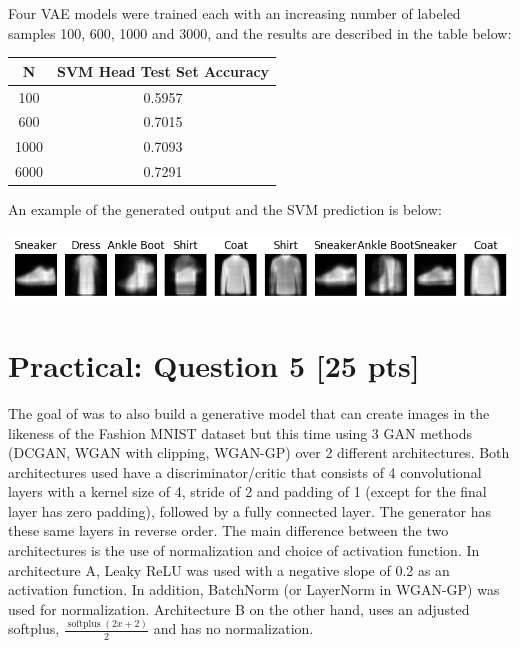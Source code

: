 \documentclass{article}
\DeclareMathOperator{\softplus}{softplus}
\begin{document}
Four VAE models were trained each with an increasing number of labeled samples 100, 600, 1000 and 3000, and the results are described in the table below:

\begin{table}[h]
    \centering
    \begin{tabular}{|c|c|}
    \hline
    N    & SVM Head Test Set Accuracy \\
    \hline
    100  & 0.5957                     \\
    \hline
    600  & 0.7015                     \\
    \hline
    1000 & 0.7093                     \\
    \hline
    6000 & 0.7291 \\
    \hline               
    \end{tabular}
\end{table}

\newpage
An example of the generated output and the SVM prediction is below:

\includegraphics[scale=0.7]{../src/svm_predict.png}

\section{Practical: Question 5 [25 pts]}

The goal of was to also build a generative model that can create images in the likeness of the Fashion MNIST dataset but this time using 3 GAN methods (DCGAN, WGAN with clipping, WGAN-GP) over 2 different architectures.
Both architectures used have a discriminator/critic that consists of 4 convolutional layers with a kernel size of 4, stride of 2 and padding of 1 (except for the final layer has 
zero padding), followed by a fully connected layer. The generator has these same layers in reverse order. The main difference between the two architectures is the use of normalization
and choice of activation function. In architecture A, Leaky ReLU was used with a negative slope of 0.2 as an activation function. In addition, BatchNorm (or LayerNorm in WGAN-GP) was used for normalization.
Architecture B on the other hand, uses an adjusted softplus, $\frac{\softplus(2x+2)}{2}$ and has no normalization. \\
\\
\end{document}
